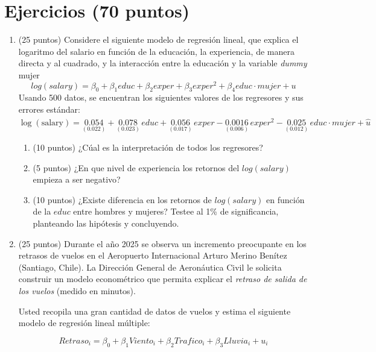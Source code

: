 \documentclass[10pt,a4paper]{article}
\begin{document}
\section{Ejercicios (70 puntos)}

\begin{enumerate}
    \color{black}
    \item (25 puntos) Considere el siguiente modelo de regresión lineal, que explica el logaritmo del salario en función de la educación, la experiencia, de manera directa y al cuadrado, y la interacción entre la educación y la variable \textit{dummy} mujer
    $$log(salary)=\beta_0 + \beta_1 educ + \beta_2exper + \beta_3 exper^2 + \beta_4 educ \cdot mujer+ u$$
    Usando 500 datos, se encuentran los siguientes valores de los regresores y sus errores estándar:
\[
\widehat{\log(\text{salary})}
= \underset{(0.022)}{0.054}
+ \underset{(0.023)}{0.078}\, educ
+ \underset{(0.017)}{0.056}\, exper
- \underset{(0.006)}{0.0016}\, exper^2
- \underset{(0.012)}{0.025}\, educ \cdot mujer
+ \hat{u}
\]
\begin{enumerate}
    \item (10 puntos) ¿Cúal es la interpretación de todos los regresores?

    \item (5 puntos) ¿En que nivel de experiencia los retornos del $log(salary)$ empieza a ser negativo? 

    \item (10 puntos) ¿Existe diferencia en los retornos de $log(salary)$ en función de la $educ$ entre hombres y mujeres? Testee al 1\% de significancia, planteando las hipótesis y concluyendo.

\end{enumerate}

    
    
      \color{black}  
    \item (25 puntos) Durante el año 2025 se observa un incremento preocupante en los retrasos de vuelos en el Aeropuerto Internacional Arturo Merino Benítez (Santiago, Chile). La Dirección General de Aeronáutica Civil le solicita construir un modelo econométrico que permita explicar el \textit{retraso de salida de los vuelos} (medido en minutos).

Usted recopila una gran cantidad de datos de vuelos y estima el siguiente modelo de regresión lineal múltiple:

\[
Retraso_i = \beta_0 + \beta_1 Viento_i + \beta_2 Trafico_i + \beta_3 Lluvia_i + u_i
\]


\end{enumerate}
\end{document}
